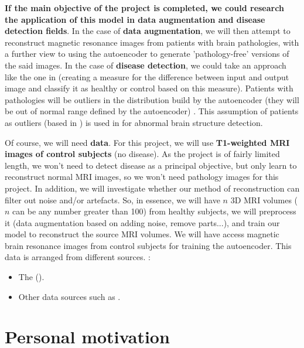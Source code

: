 \textbf{If the main objective of the project is completed, we could research the application of this model in data augmentation and disease detection fields}. In the case of \textbf{data augmentation}, we will then attempt to reconstruct magnetic resonance images from patients with brain pathologies, with a further view to using the autoencoder to generate 'pathology-free' versions of the said images. In the case of \textbf{disease detection}, we could take an approach like the one in \cite{pinaya2019} (creating a measure for the difference between input and output image and classify it as healthy or control based on this measure). Patients with pathologies will be outliers in the distribution build by the autoencoder (they will be out of normal range defined by the autoencoder) \cite{marquand2016normative} \cite{mourao2011outlier}. This assumption of patients as outliers (based in \cite{mourao2011outlier}) is used in \cite{pinaya2019} for abnormal brain structure detection.

Of course, we will need \textbf{data}. For this project, we will use \textbf{T1-weighted MRI images of control subjects} (no disease). As the project is of fairly limited length, we won't need to detect disease as a principal objective, but only learn to reconstruct normal MRI images, so we won't need pathology images for this project. In addition, we will investigate whether our method of reconstruction can filter out noise and/or artefacts. So, in essence, we will have $n$ 3D MRI volumes ($n$ can be any number greater than 100) from healthy subjects, we will preprocess it (data augmentation based on adding noise, remove parts...), and train our model to reconstruct the source MRI volumes. We will have access magnetic brain resonance images from control subjects for training the autoencoder. This data is arranged from different sources. :

\begin{itemize}
    \item The  ().
    \item Other data sources such as .
\end{itemize}



\section{Personal motivation}

